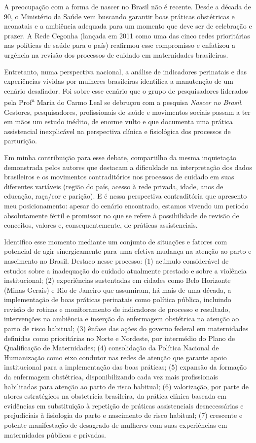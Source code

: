 \documentclass{article}
\begin{document}
A preocupação com a forma de nascer no Brasil não é recente. Desde a década de
90, o
Ministério da Saúde vem buscando garantir boas práticas obstétricas e neonatais
e a ambiência
adequada para um momento que deve ser de celebração e prazer. A Rede Cegonha
(lançada em 2011
como uma das cinco redes prioritárias nas políticas de saúde para o país)
reafirmou esse
compromisso e enfatizou a urgência na revisão dos processos de cuidado em
maternidades
brasileiras.

Entretanto, numa perspectiva nacional, a análise de indicadores perinatais e das
experiências
vividas por mulheres brasileiras identifica a manutenção de um cenário
desafiador. Foi sobre
esse cenário que o grupo de pesquisadores liderados pela Prof\textsuperscript{a}
Maria do Carmo Leal se debruçou com a pesquisa \textit{Nascer no Brasil}.
Gestores, pesquisadores, profissionais de saúde e movimentos sociais passam a
ter em mãos um
estudo inédito, de enorme vulto e que documenta uma prática assistencial
inexplicável na
perspectiva clínica e fisiológica dos processos de parturição.

Em minha contribuição para esse debate, compartilho da mesma inquietação
demonstrada pelos
autores que destacam a dificuldade na interpretação dos dados brasileiros e os
movimentos
contraditórios nos processos de cuidado em suas diferentes variáveis (região do
país, acesso à
rede privada, idade, anos de educação, raça/cor e parição). E é nessa
perspectiva
contraditória que apresento meu posicionamento: apesar do cenário encontrado,
estamos vivendo
um período absolutamente fértil e promissor no que se refere à possibilidade de
revisão de
conceitos, valores e, consequentemente, de práticas assistenciais.

Identifico esse momento mediante um conjunto de situações e fatores com
potencial de agir
sinergicamente para uma efetiva mudança na atenção ao parto e nascimento no
Brasil. Destaco
nesse processo: (1) acúmulo considerável de estudos sobre a inadequação do
cuidado atualmente
prestado e sobre a violência institucional; (2) experiências sustentadas em
cidades como Belo
Horizonte (Minas Gerais) e Rio de Janeiro que assumiram, há mais de uma década,
a
implementação de boas práticas perinatais como política pública, incluindo
revisão de rotinas
e monitoramento de indicadores de processo e resultado, intervenções na
ambiência e inserção
da enfermagem obstétrica na atenção ao parto de risco habitual; (3) ênfase das
ações do
governo federal em maternidades definidas como prioritárias no Norte e Nordeste,
por
intermédio do Plano de Qualificação de Maternidades; (4) consolidação da
Política Nacional de
Humanização como eixo condutor nas redes de atenção que garante apoio
institucional para a
implementação das boas práticas; (5) expansão da formação da enfermagem
obstétrica,
disponibilizando cada vez mais profissionais habilitadas para atenção ao parto
de risco
habitual; (6) valorização, por parte de atores estratégicos na obstetrícia
brasileira, da
prática clínica baseada em evidências em substituição à repetição de práticas
assistenciais
desnecessárias e prejudiciais à fisiologia do parto e nascimento de risco
habitual; (7)
crescente e potente manifestação de desagrado de mulheres com suas experiências
em
maternidades públicas e privadas.
\end{document}
